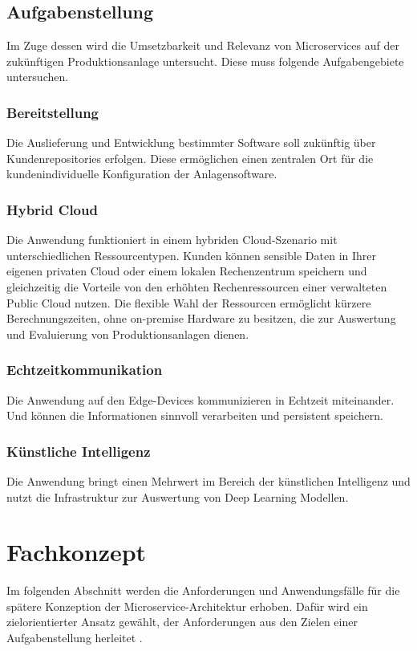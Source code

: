 \subsection{Aufgabenstellung}
Im Zuge dessen wird die Umsetzbarkeit und Relevanz von Microservices auf der zukünftigen Produktionsanlage untersucht. 
Diese muss folgende Aufgabengebiete untersuchen.


\subsubsection{Bereitstellung}
Die Auslieferung und Entwicklung bestimmter Software soll zukünftig über Kundenrepositories erfolgen. 
Diese ermöglichen einen zentralen Ort für die kundenindividuelle Konfiguration der Anlagensoftware. 

\subsubsection{Hybrid Cloud}
Die Anwendung funktioniert in einem hybriden Cloud-Szenario mit unterschiedlichen Ressourcentypen. Kunden können sensible Daten in Ihrer eigenen
privaten Cloud oder einem lokalen Rechenzentrum speichern und gleichzeitig die
Vorteile von den erhöhten Rechenressourcen einer verwalteten Public Cloud nutzen.
Die flexible Wahl der Ressourcen ermöglicht kürzere Berechnungszeiten, ohne on-premise Hardware zu besitzen, die zur Auswertung und Evaluierung von Produktionsanlagen dienen.

\subsubsection{Echtzeitkommunikation}
Die Anwendung auf den Edge-Devices kommunizieren in Echtzeit miteinander. 
Und können die Informationen sinnvoll verarbeiten und persistent speichern.

\subsubsection{Künstliche Intelligenz}
Die Anwendung bringt einen Mehrwert im Bereich der künstlichen Intelligenz und nutzt die Infrastruktur zur Auswertung von Deep Learning Modellen. 

\newpage
\section{Fachkonzept}
Im folgenden Abschnitt werden die Anforderungen und Anwendungsfälle für die spätere Konzeption der Microservice-Architektur erhoben.
Dafür wird ein zielorientierter Ansatz gewählt, der Anforderungen aus den Zielen einer Aufgabenstellung herleitet \cite[S.47]{Laplante}. 

